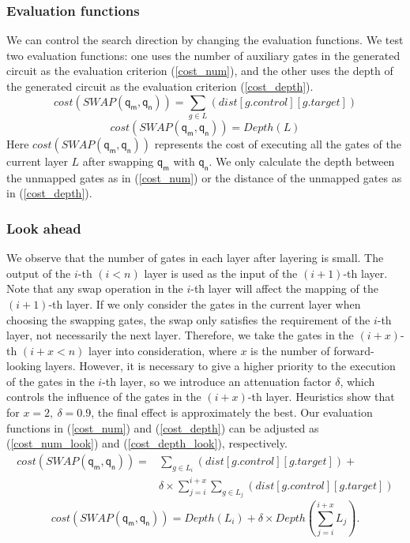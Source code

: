 \documentclass[runningheads]{llncs}
\begin{document}
\subsubsection{Evaluation functions }
We can control the search direction by changing the evaluation functions.
We test two evaluation functions: one uses the number of auxiliary gates in the generated circuit as the evaluation criterion (\ref{cost_num}),  and the other uses the depth of the generated circuit as the evaluation criterion  (\ref{cost_depth}).
\begin{equation}
	cost(SWAP(\textsf{q}_\textsf{m},\textsf{q}_\textsf{n}))= \sum_{g \in L}(dist[g.control][g.target])
	\label{cost_num}
\end{equation}
	\begin{equation}
		cost(SWAP(\textsf{q}_\textsf{m},\textsf{q}_\textsf{n}))= Depth(L)
		\label{cost_depth}
		\end{equation}
Here $cost(SWAP(\textsf{q}_\textsf{m},\textsf{q}_\textsf{n}))$ represents the cost of executing all the gates of the current layer $L$ 
after swapping $\textsf{q}_\textsf{m}$ with $\textsf{q}_\textsf{n}$. We only calculate the depth between the unmapped gates as in (\ref{cost_num}) or the distance of the unmapped gates as in (\ref{cost_depth}).

\subsubsection{Look ahead }
We observe that the number of gates in each layer after layering is small. The output of the $i$-th $(i<n)$ layer is used as the input of the $(i+1)$-th layer. Note that any swap operation in the $i$-th layer will affect the mapping of the $(i+1)$-th layer. If we only consider the gates in the current layer when choosing the swapping gates, the swap only satisfies the requirement of the $i$-th layer, not necessarily the next layer. Therefore, we take the gates in the $(i+x)$-th $(i+x< n)$ layer into consideration, where $x$ is the number of forward-looking layers. However, it is necessary to give a higher priority to the execution of the gates in the $i$-th layer, so we introduce an attenuation factor $\delta$, which controls the influence of the gates in the $(i+x)$-th layer. Heuristics show that for $x=2,\ \delta=0.9$, the final effect is  approximately the best. Our evaluation functions in (\ref{cost_num}) and  (\ref{cost_depth}) can be adjusted as
(\ref{cost_num_look}) and  (\ref{cost_depth_look}), respectively.
 \begin{equation}
	 	\begin{aligned}
			cost(SWAP(\textsf{q}_\textsf{m},\textsf{q}_\textsf{n}))=&\sum_{g \in L_{i}}(dist[g.control][g.target])+\\
	&\delta \times \sum_{j=i}^{i+x}\sum_{g \in L_{j}}(dist[g.control][g.target])
	\label{cost_num_look}
	\end{aligned}
 \end{equation}
	\begin{equation}
		cost(SWAP(\textsf{q}_\textsf{m},\textsf{q}_\textsf{n}))= Depth(L_{i})+\delta \times Depth(\sum_{j=i}^{i+x}L_{j}).
		\label{cost_depth_look}
		\end{equation}
\end{document}

